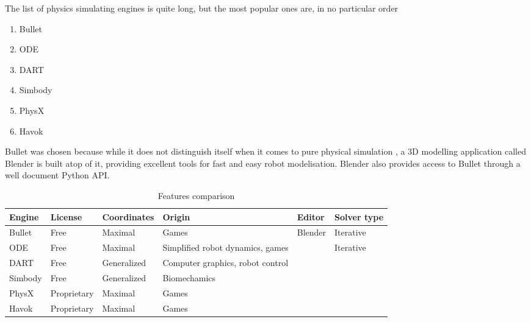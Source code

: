 \cite{blender_for_robotics}
The list of physics simulating engines is quite long, but the most popular ones are, in no particular order
\begin{enumerate}
\item Bullet
\item ODE
\item DART
\item Simbody
\item PhysX
\item Havok
\end{enumerate}
Bullet was chosen because while it does not distinguish itself when it comes to pure physical simulation \cite{engines_comparison}, a 3D modelling application called Blender is built atop of it, providing excellent tools for fast and easy robot modelisation. Blender also provides access to Bullet through a well document Python API.

\begin{table}[htp]
\center
\caption{Features comparison}
\begin{tabularx}{\textwidth}{@{} X X X X X X @{}}
\toprule
\textbf{Engine} & \textbf{License} & \textbf{Coordinates} & \textbf{Origin} & \textbf{Editor} &\textbf{Solver type}\\ 
\midrule
Bullet & Free & Maximal & Games & Blender & Iterative \\ 

ODE & Free & Maximal & Simplified robot dynamics, games & & Iterative\\ 

DART & Free & Generalized & Computer graphics, robot control & &\\

Simbody & Free & Generalized & Biomechamics & \\

PhysX & Proprietary & Maximal & Games & \\

Havok & Proprietary & Maximal & Games & \\
\bottomrule
\end{tabularx}
\label{table:specs}
\end{table}